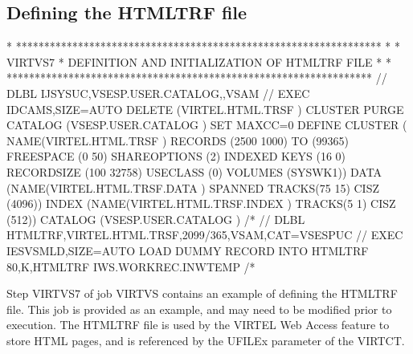 \documentclass[letterpaper,10pt,english]{sphinxmanual}
\begin{document}
\subsection{Defining the HTMLTRF file}
\label{\detokenize{Installation_Guide:defining-the-htmltrf-file}}
\begin{sphinxVerbatim}[commandchars=\\\{\}]
* *****************************************************************
* * VIRTVS7 * DEFINITION AND INITIALIZATION OF HTMLTRF FILE *
* *****************************************************************
// DLBL IJSYSUC,\PYGZsq{}VSESP.USER.CATALOG\PYGZsq{},,VSAM
// EXEC IDCAMS,SIZE=AUTO
  DELETE (VIRTEL.HTML.TRSF ) \PYGZhy{}
    CLUSTER \PYGZhy{}
    PURGE \PYGZhy{}
    CATALOG (VSESP.USER.CATALOG )
  SET MAXCC=0
  DEFINE CLUSTER ( \PYGZhy{}
    NAME(VIRTEL.HTML.TRSF ) \PYGZhy{}
    RECORDS (2500 1000) \PYGZhy{}
    TO (99365) \PYGZhy{}
    FREESPACE (0 50) \PYGZhy{}
    SHAREOPTIONS (2) \PYGZhy{}
    INDEXED \PYGZhy{}
    KEYS (16 0) \PYGZhy{}
    RECORDSIZE (100 32758) \PYGZhy{}
    USECLASS (0) \PYGZhy{}
    VOLUMES (SYSWK1)) \PYGZhy{}
  DATA (NAME(VIRTEL.HTML.TRSF.DATA ) \PYGZhy{}
    SPANNED \PYGZhy{}
    TRACKS(75 15) \textendash{}
    CISZ (4096)) \PYGZhy{}
  INDEX (NAME(VIRTEL.HTML.TRSF.INDEX ) \PYGZhy{}
    TRACKS(5 1) \textendash{}
    CISZ (512)) \PYGZhy{}
    CATALOG (VSESP.USER.CATALOG )
/*
// DLBL HTMLTRF,\PYGZsq{}VIRTEL.HTML.TRSF\PYGZsq{},2099/365,VSAM,CAT=VSESPUC
// EXEC IESVSMLD,SIZE=AUTO LOAD DUMMY RECORD INTO HTMLTRF
80,K,HTMLTRF
\PYGZdl{}\PYGZdl{}\PYGZdl{}\PYGZdl{}IWS.WORKREC.INW\PYGZdl{}TEMP
/*
\end{sphinxVerbatim}

\sphinxAtStartPar
{}

\sphinxAtStartPar
Step VIRTVS7 of job VIRTVS contains an example of defining the HTMLTRF file. This job is provided as an example, and may need to be modified prior to execution. The HTMLTRF file is used by the VIRTEL Web Access feature to store HTML pages, and is referenced by the UFILEx parameter of the VIRTCT.
\end{document}

